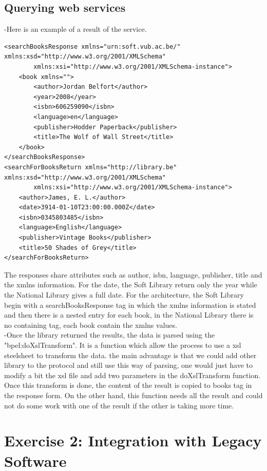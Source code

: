 \documentclass[a4paper,10pt]{article}
\begin{document}
\subsection{Querying web services}
-Here is an example of a result of the service.
\begin{verbatim}
<searchBooksResponse xmlns="urn:soft.vub.ac.be/" xmlns:xsd="http://www.w3.org/2001/XMLSchema"
        xmlns:xsi="http://www.w3.org/2001/XMLSchema-instance">
    <book xmlns="">
        <author>Jordan Belfort</author>
        <year>2008</year>
        <isbn>606259090</isbn>
        <language>en</language>
        <publisher>Hodder Paperback</publisher>
        <title>The Wolf of Wall Street</title>
    </book>
</searchBooksResponse>
<searchForBooksReturn xmlns="http://library.be" xmlns:xsd="http://www.w3.org/2001/XMLSchema" 
        xmlns:xsi="http://www.w3.org/2001/XMLSchema-instance">
    <author>James, E. L.</author>
    <date>3914-01-10T23:00:00.000Z</date>
    <isbn>0345803485</isbn>
    <language>English</language>
    <publisher>Vintage Books</publisher>
    <title>50 Shades of Grey</title>
</searchForBooksReturn>
\end{verbatim}
The responses share attributes such as author, isbn, language, publisher, title and the xmlns information. For the date, the Soft Library return only the year while the National Library gives a full date. For the architecture, the Soft Library begin with a searchBooksResponse tag in which the xmlns information is stated and then there is a nested entry for each book, in the National Library there is no containing tag, each book contain the xmlns values.\\

-Once the library returned the results, the data is parsed using the "bpel:doXslTransform". It is a function which allow the process to use a xsl steelsheet to transform the data. the main advantage is that we could add other library to the protocol and still use this way of parsing, one would just have to modify a bit the xsl file and add two parameters in the doXslTransform function. Once this transform is done, the content of the result is copied to books tag in the response form. On the other hand, this function needs all the result and could not do some work with one of the result if the other is taking more time.

\section{Exercise 2: Integration with Legacy Software}
\end{document}
